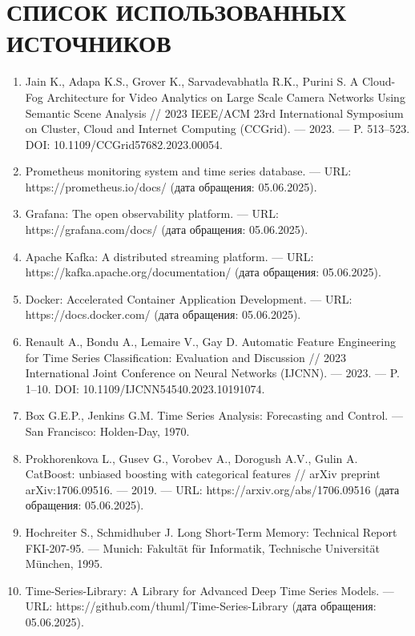 \chapter*{СПИСОК ИСПОЛЬЗОВАННЫХ ИСТОЧНИКОВ}


\begin{enumerate}[label=\arabic*)\hspace{1em}, leftmargin=1cm, itemsep=0em]
	\item Jain K., Adapa K.S., Grover K., Sarvadevabhatla R.K., Purini S. A Cloud-Fog Architecture for Video Analytics on Large Scale Camera Networks Using Semantic Scene Analysis // 2023 IEEE/ACM 23rd International Symposium on Cluster, Cloud and Internet Computing (CCGrid). — 2023. — P. 513–523. DOI: 10.1109/CCGrid57682.2023.00054.
	\item Prometheus monitoring system and time series database. — URL: https://prometheus.io/docs/ (дата обращения: 05.06.2025).
	\item Grafana: The open observability platform. — URL: https://grafana.com/docs/ (дата обращения: 05.06.2025).
	\item Apache Kafka: A distributed streaming platform. — URL: https://kafka.apache.org/documentation/ (дата обращения: 05.06.2025).
	\item Docker: Accelerated Container Application Development. — URL: https://docs.docker.com/ (дата обращения: 05.06.2025).
	\item Renault A., Bondu A., Lemaire V., Gay D. Automatic Feature Engineering for Time Series Classification: Evaluation and Discussion // 2023 International Joint Conference on Neural Networks (IJCNN). — 2023. — P. 1–10. DOI: 10.1109/IJCNN54540.2023.10191074.
	\item Box G.E.P., Jenkins G.M. Time Series Analysis: Forecasting and Control. — San Francisco: Holden-Day, 1970.
	\item Prokhorenkova L., Gusev G., Vorobev A., Dorogush A.V., Gulin A. CatBoost: unbiased boosting with categorical features // arXiv preprint arXiv:1706.09516. — 2019. — URL: https://arxiv.org/abs/1706.09516 (дата обращения: 05.06.2025).
	\item Hochreiter S., Schmidhuber J. Long Short-Term Memory: Technical Report FKI-207-95. — Munich: Fakultät für Informatik, Technische Universität München, 1995.
	\item Time-Series-Library: A Library for Advanced Deep Time Series Models. — URL: https://github.com/thuml/Time-Series-Library (дата обращения: 05.06.2025).

\end{enumerate}
